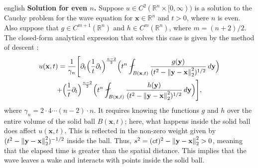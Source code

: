 \documentclass[0000.tex]{subfiles}
\begin{document}
\begin{hyphenrules}{english}
\textbf{Solution for even $n$.}
Suppose $u\in C^2(\mathbb{R}^n\times[0,\infty))$ is a solution to the Cauchy problem for the wave equation for
$\mathbf{x}\in\mathbb{R}^n$ and $t>0$, where $n$ is even. Also suppose that $g\in C^{m+1}(\mathbb{R}^n)$ and $h\in C^m(\mathbb{R}^n)$,
where $m=(n+2)/2$. The closed-form analytical expression that solves this case is given by the method
of descent \cite{evans2010}:
\begin{multline}
  u(\mathbf{x},t)=\frac{1}{\gamma_n}\Bigg[\partial_t\Big(\frac1t\partial_t\Big)^{\frac{n-2}{2}}
    \Big(t^{n}\fint_{B(\mathbf{x},t)}\frac{g(\mathbf{y})}{(t^2-\norm{\mathbf{y}-\mathbf{x}}_2^2)^{1/2}}\,d\mathbf{y}\Big)\\
    +\Big(\frac1t\partial_t\Big)^{\frac{n-2}{2}}
    \Big(t^{n}\fint_{B(\mathbf{x},t)}\frac{h(\mathbf{y})}{(t^2-\norm{\mathbf{y}-\mathbf{x}}_2^2)^{1/2}}\,d\mathbf{y}\Big)\Bigg],
  \label{eq:wave-even}
\end{multline}
where $\gamma_n=2\cdot4\cdots(n-2)\cdot n$. It requires knowing the functions $g$ and $h$ over the
entire volume of the solid ball $B(\mathbf{x},t)$; here, what happens inside the solid ball does affect
$u(\mathbf{x},t)$. This is reflected in the non-zero weight given by $(t^2-\left\lVert \mathbf{y}-\mathbf{x} \right\rVert_2^2)^{-1/2}$ inside the
ball. Thus, $s^2=(ct)^2-\left\lVert \mathbf{y}-\mathbf{x} \right\rVert_2^2>0$, meaning that the elapsed time is greater than the spatial
distance. This implies that the wave leaves a wake and interacts with points inside the solid ball.


\end{hyphenrules}
\end{document}
